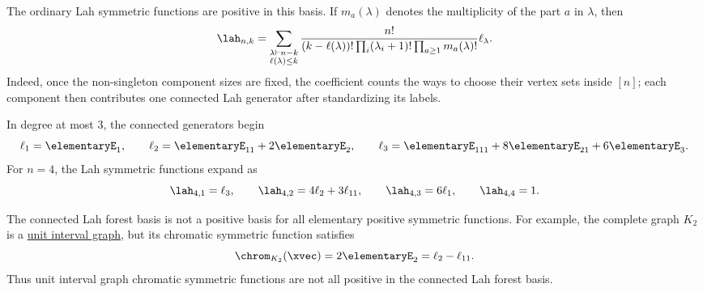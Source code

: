 The ordinary Lah symmetric functions are positive in this basis.  If
$m_a(\lambda)$ denotes the multiplicity of the part $a$ in $\lambda$, then
\[
  \lah_{n,k} =
  \sum_{\substack{\lambda \vdash n-k \\ \ell(\lambda) \leq k}}
  \frac{n!}
  {(k-\ell(\lambda))!\prod_i(\lambda_i+1)!
   \prod_{a\geq 1} m_a(\lambda)!}
  \ell_\lambda .
\]
Indeed, once the non-singleton component sizes are fixed, the coefficient
counts the ways to choose their vertex sets inside $[n]$; each component then
contributes one connected Lah generator after standardizing its labels.

\begin{example*}
In degree at most $3$, the connected generators begin
\[
  \ell_1=\elementaryE_1,\qquad
  \ell_2=\elementaryE_{11}+2\elementaryE_2,\qquad
  \ell_3=\elementaryE_{111}+8\elementaryE_{21}+6\elementaryE_3.
\]
For $n=4$, the Lah symmetric functions expand as
\[
  \lah_{4,1}=\ell_3,\qquad
  \lah_{4,2}=4\ell_2+3\ell_{11},\qquad
  \lah_{4,3}=6\ell_1,\qquad
  \lah_{4,4}=1.
\]
\end{example*}

\begin{remark*}
The connected Lah forest basis is not a positive basis for all elementary
positive symmetric functions.  For example, the complete graph $K_2$ is a
\hyperref[chromaticQuasisymmetricUnitIntervalGraph]{unit interval graph}, but
its chromatic symmetric function satisfies
\[
  \chrom_{K_2}(\xvec) = 2\elementaryE_2 = \ell_2-\ell_{11}.
\]
Thus unit interval graph chromatic symmetric functions are not all positive
in the connected Lah forest basis.
\end{remark*}
